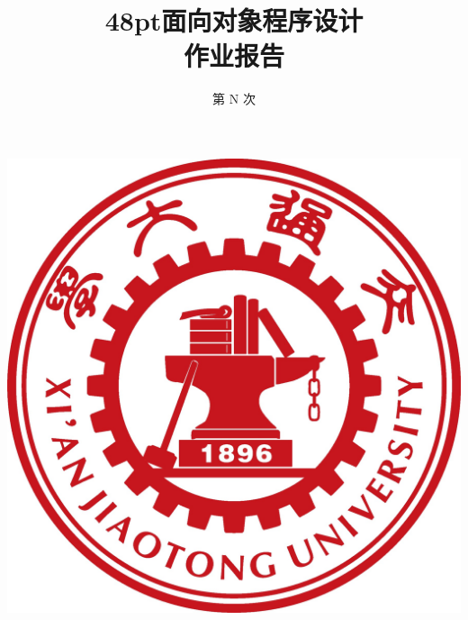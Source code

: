 \documentclass{article}
\title{\textbf {\kaishu\fontsize{48pt} {48pt}\selectfont 面向对象程序设计\\[15pt]作业报告}}
\author{\reduline{\fontsize{1pt}{1pt}\selectfont \hspace*{400pt}}}
\date{\fontsize{25pt}{20pt}\selectfont 第\,\,N\,\,次}
\begin{document}
\maketitle
\begin{center}
\includegraphics[scale = 0.14]{honor.jpg}%
\\[50pt] %
\end{center}
\end{document}
